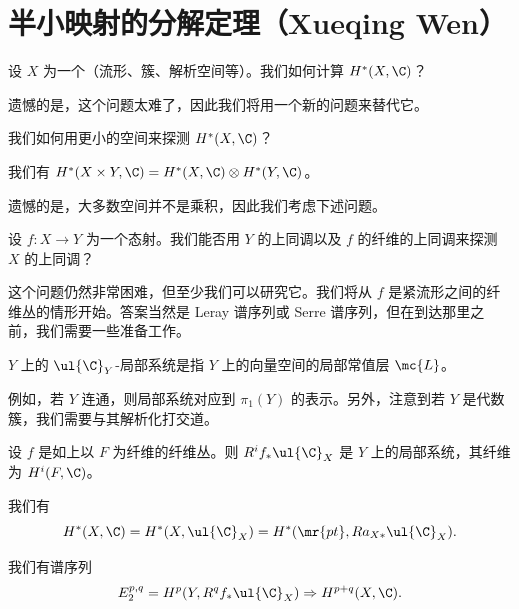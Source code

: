 \section{半小映射的分解定理（Xueqing Wen）}%
\label{sec:Decomposition theorem for semi-small maps (Xueqing Wen)}

\begin{quest}
    设 \(X\) 为一个（流形、簇、解析空间等）。我们如何计算 \(H^*(X, \C)\)？
\end{quest}

遗憾的是，这个问题太难了，因此我们将用一个新的问题来替代它。

\begin{quest}
    我们如何用更小的空间来探测 \(H^*(X, \C)\)？
\end{quest}

\begin{thm}[K\"unneth 公式]
    我们有 \(H^*(X \times Y, \C) = H^*(X, \C) \otimes H^*(Y, \C)\)。
\end{thm}

遗憾的是，大多数空间并不是乘积，因此我们考虑下述问题。

\begin{quest}
    设 \(f \colon X \to Y\) 为一个态射。我们能否用 \(Y\) 的上同调以及 \(f\) 的纤维的上同调来探测 \(X\) 的上同调？
\end{quest}

这个问题仍然非常困难，但至少我们可以研究它。我们将从 \(f\) 是紧流形之间的纤维丛的情形开始。答案当然是 Leray 谱序列或 Serre 谱序列，但在到达那里之前，我们需要一些准备工作。

\begin{defn}
    \(Y\) 上的 \(\ul{\C}_Y\)-局部系统是指 \(Y\) 上的向量空间的局部常值层 \(\mc{L}\)。
\end{defn}

例如，若 \(Y\) 连通，则局部系统对应到 \(\pi_1(Y)\) 的表示。另外，注意到若 \(Y\) 是代数簇，我们需要与其解析化打交道。

\begin{exm}
    设 \(f\) 是如上以 \(F\) 为纤维的纤维丛。则 \(R^i f_* \ul{\C}_X\) 是 \(Y\) 上的局部系统，其纤维为 \(H^i(F, \C)\)。
\end{exm}

\begin{prop}
    我们有
    \[ H^*(X, \C) = H^*(X, \ul{\C}_X) = H^*(\mr{pt}, R a_{X*} \ul{\C}_X). \]
\end{prop}

\begin{thm}
    我们有谱序列
    \[ E_2^{p,q} = H^p(Y, R^q f_* \ul{\C}_X) \Rightarrow H^{p+q}(X, \C). \]
\end{thm}

